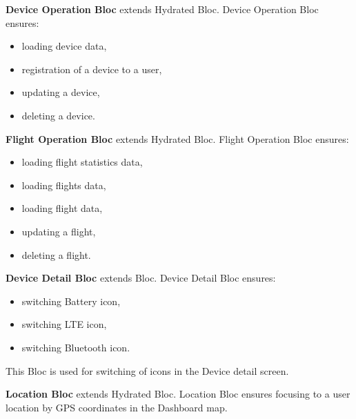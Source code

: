\textbf{Device Operation Bloc} extends Hydrated Bloc.
Device Operation Bloc ensures:
\begin{itemize}
    \item loading device data,
    \item registration of a device to a user,
    \item updating a device,
    \item deleting a device.
\end{itemize}
\textbf{Flight Operation Bloc} extends Hydrated Bloc.
Flight Operation Bloc ensures:
\begin{itemize}
    \item loading flight statistics data,
    \item loading flights data,
    \item loading flight data,
    \item updating a flight,
    \item deleting a flight.
\end{itemize}
\textbf{Device Detail Bloc} extends Bloc.
Device Detail Bloc ensures:
\begin{itemize}
    \item switching Battery icon,
    \item switching LTE icon,
    \item switching Bluetooth icon.
\end{itemize}
This Bloc is used for switching of icons in the Device detail screen.

\textbf{Location Bloc} extends Hydrated Bloc.
Location Bloc ensures focusing to a user location by GPS coordinates in the Dashboard map.

